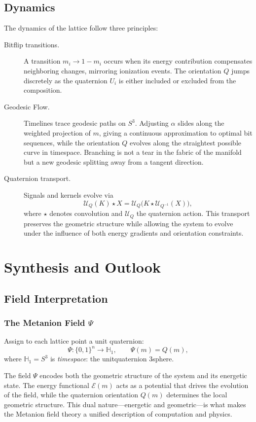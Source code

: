 \documentclass{article}
\begin{document}
\subsection{Dynamics}
The dynamics of the lattice follow three principles:
\begin{description}
  \item[Bit\textendash flip transitions.] A transition $m_i \rightarrow 1 - m_i$ occurs when its energy contribution compensates neighboring changes, mirroring ionization events. The orientation $Q$ jumps discretely as the quaternion $U_i$ is either included or excluded from the composition.
  
  \item[Geodesic Flow.] Timelines trace geodesic paths on $S^3$. Adjusting $\alpha$ slides along the weighted projection of $m$, giving a continuous approximation to optimal bit sequences, while the orientation $Q$ evolves along the straightest possible curve in timespace. Branching is not a tear in the fabric of the manifold but a new geodesic splitting away from a tangent direction.
  
  \item[Quaternion transport.] Signals and kernels evolve via
  \[
  \mathcal{U}_Q(K) \star X = \mathcal{U}_Q\big(K \star \mathcal{U}_{Q^{-1}}(X)\big),
  \]
  where $\star$ denotes convolution and $\mathcal{U}_Q$ the quaternion action. This transport preserves the geometric structure while allowing the system to evolve under the influence of both energy gradients and orientation constraints.
\end{description}

\section{Synthesis and Outlook}

\subsection{Field Interpretation}
\subsubsection{The Metanion Field $\Psi$}
Assign to each lattice point a unit quaternion:
\[
\Psi: \{0,1\}^n \to \mathbb{H}_1, \qquad \Psi(m) = Q(m),
\]
where $\mathbb{H}_1 = S^3$ is \emph{timespace}: the unit\textendash quaternion 3\textendash sphere.

The field $\Psi$ encodes both the geometric structure of the system and its energetic state. The energy functional $\mathcal{E}(m)$ acts as a potential that drives the evolution of the field, while the quaternion orientation $Q(m)$ determines the local geometric structure. This dual nature---energetic and geometric---is what makes the Metanion field theory a unified description of computation and physics.
\end{document}
